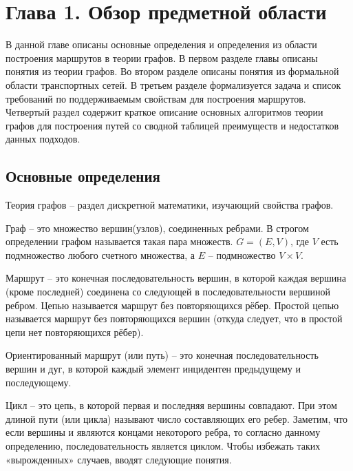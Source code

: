 \chapter{Глава 1. Обзор предметной области}
В данной главе описаны основные определения и определения из области построения маршрутов в теории графов. В первом разделе главы описаны понятия из теории графов. Во втором разделе описаны понятия из формальной области транспортных сетей. В третьем разделе формализуется задача и список требований по поддерживаемым свойствам для построения маршрутов. Четвертый раздел содержит краткое описание основных алгоритмов теории графов для построения путей со сводной таблицей преимуществ и недостатков данных подходов.

\section{Основные определения}
\begin{definition}
Теория графов -- раздел дискретной математики, изучающий свойства графов.
\end{definition}

\begin{definition}
Граф -- это множество вершин(узлов), соединенных ребрами. В строгом определении графом называется такая пара множеств. $G=(E, V)$, где $V$ есть подмножество любого счетного множества, а $E$ -- подмножество $V \times V$.
\end{definition}

\begin{definition}
Маршрут -- это конечная последовательность вершин, в которой каждая вершина (кроме последней) соединена со следующей в последовательности вершиной ребром. Цепью называется маршрут без повторяющихся рёбер. Простой цепью называется маршрут без повторяющихся вершин (откуда следует, что в простой цепи нет повторяющихся рёбер).
\end{definition}

\begin{definition}
Ориентированный маршрут (или путь) -- это конечная последовательность вершин и дуг, в которой каждый элемент инцидентен предыдущему и последующему.
\end{definition}

\begin{definition}
Цикл -- это цепь, в которой первая и последняя вершины совпадают. При этом длиной пути (или цикла) называют число составляющих его ребер. Заметим, что если вершины и являются концами некоторого ребра, то согласно данному определению, последовательность является циклом. Чтобы избежать таких «вырожденных» случаев, вводят следующие понятия.
\end{definition}

